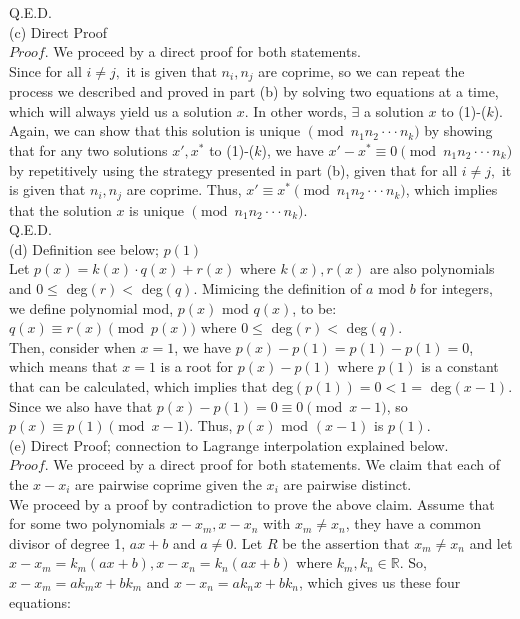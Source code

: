 \documentclass{article}
\begin{document}
Q.E.D. \\[.3cm]
(c) Direct Proof \\[.1cm]
$\textit{Proof.}$ We proceed by a direct proof for both statements. \\[.1cm]
\indent Since for all $i\neq j,$ it is given that $n_i, n_j$ are coprime, so we can repeat the process we described and proved in part (b) by solving two equations at a time, which will always yield us a solution $x$. In other words, $\exists$ a solution $x$ to (1)-($k$). \\[.1cm]
\indent Again, we can show that this solution is unique $\pmod{n_1n_2\cdot\cdot\cdot n_k}$ by showing that for any two solutions $x', x^*$ to (1)-($k$), we have $x'-x^*\equiv0\pmod{n_1n_2\cdot\cdot\cdot n_k}$ by repetitively using the strategy presented in part (b), given that for all $i\neq j,$ it is given that $n_i, n_j$ are coprime. Thus, $x'\equiv x^*\pmod{n_1n_2\cdot\cdot\cdot n_k}$, which implies that the solution $x$ is unique $\pmod{n_1n_2\cdot\cdot\cdot n_k}$. \\[.1cm]
Q.E.D. \\[.3cm]
(d) Definition see below; $p(1)$ \\[.1cm]
\indent Let $p(x) = k(x)\cdot q(x) + r(x)$ where $k(x), r(x)$ are also polynomials and $0\leq$ deg$(r) <$ deg$(q)$.
Mimicing the definition of $a$ mod $b$ for integers, we define polynomial mod, $p(x)$ mod $q(x)$, to be: $q(x)\equiv r(x)\pmod{p(x)}$ where $0\leq$ deg$(r) <$ deg$(q)$. \\[.1cm]
\indent Then, consider when $x = 1$, we have $p(x) - p(1) = p(1) - p(1) = 0$, which means that $x = 1$ is a root for $p(x) - p(1)$ where $p(1)$ is a constant that can be calculated, which implies that deg$(p(1)) = 0 < 1 = $ deg$(x-1).$ Since we also have that $p(x) - p(1) = 0\equiv0\pmod{x-1}$, so $p(x)\equiv p(1)\pmod{x-1}$. Thus, $p(x)$ mod $(x-1)$ is $p(1).$ \\[.3cm]
(e) Direct Proof; connection to Lagrange interpolation explained below. \\[.1cm]
$\textit{Proof.}$ We proceed by a direct proof for both statements. We claim that each of the $x-x_i$ are pairwise coprime given the $x_i$ are pairwise distinct. \\[.1cm]
\indent We proceed by a proof by contradiction to prove the above claim. Assume that for some two polynomials $x-x_m, x-x_n$ with $x_m\neq x_n$, they have a common divisor of degree 1, $ax+b$ and $a\neq0$. Let $R$ be the assertion that $x_m\neq x_n$ and let $x-x_m = k_m(ax+b), x-x_n = k_n(ax+b)$ where $k_m, k_n\in\mathbb{R}.$ So, $x-x_m = ak_mx + bk_m$ and $x-x_n = ak_nx + bk_n$, which gives us these four equations:
\end{document}
